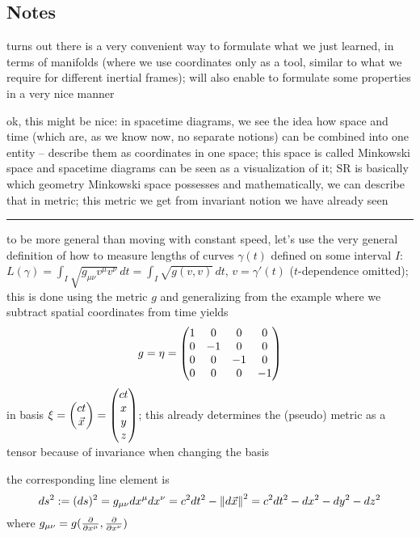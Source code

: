 		\subsection{Notes}

turns out there is a very convenient way to formulate what we just learned, in terms of manifolds (where we use coordinates only as a tool, similar to what we require for different inertial frames); will also enable to formulate some properties in a very nice manner

ok, this might be nice: in spacetime diagrams, we see the idea how space and time (which are, as we know now, no separate notions) can be combined into one entity -- describe them as coordinates in one space; this space is called Minkowski space and spacetime diagrams can be seen as a visualization of it; SR is basically which geometry Minkowski space possesses and mathematically, we can describe that in metric; this metric we get from invariant notion we have already seen




\hrule




to be more general than moving with constant speed, let's use the very general definition of how to measure lengths of curves $\gamma(t)$ defined on some interval $I$: $L(\gamma) = \int_I \sqrt{g_{\mu \nu} v^\mu v^\nu} \, dt = \int_I \sqrt{g(v, v)} \, dt$, $v = \gamma'(t)$ ($t$-dependence omitted); this is done using the metric $g$ and generalizing from the example where we subtract spatial coordinates from time yields
\begin{equation}
g = \eta = \mqty(1 & 0 & 0 & 0 \\ 0 & -1 & 0 & 0 \\ 0 & 0 & -1 & 0 \\ 0 & 0 & 0 & -1)
\end{equation}
in basis $\mathbf{\xi} = \mqty(c t \\ \vec{x}) = \mqty(c t \\ x \\ y \\ z)$; this already determines the (pseudo) metric as a tensor because of invariance when changing the basis

the corresponding line element is
\begin{equation}
ds^2 := (ds)^2 = g_{\mu \nu} dx^\mu dx^\nu = c^2 dt^2 - \norm{d\vec{x}}^2 = c^2 dt^2 - dx^2 - dy^2 - dz^2
\end{equation}
where $g_{\mu \nu} = g(\pdv{x^\mu}, \pdv{x^\nu})$


